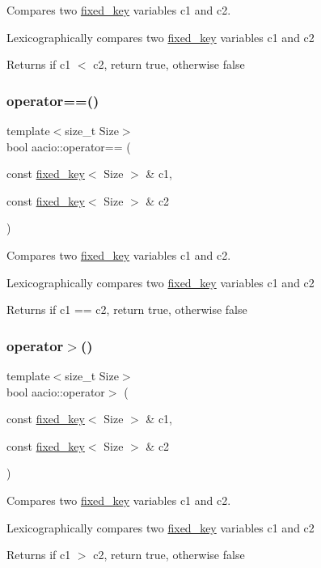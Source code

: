 Compares two \mbox{\hyperlink{classaacio_1_1fixed__key}{fixed\+\_\+key}} variables c1 and c2. 

Lexicographically compares two \mbox{\hyperlink{classaacio_1_1fixed__key}{fixed\+\_\+key}} variables c1 and c2 \begin{DoxyReturn}{Returns}
if c1 $<$ c2, return true, otherwise false 
\end{DoxyReturn}
\mbox{\label{group__fixed__key_gaa365a67b127212444054c9efbaad8b4b}} 
\subsubsection{\texorpdfstring{operator==()}{operator==()}}
{\footnotesize\ttfamily template$<$size\+\_\+t Size$>$ \\
bool aacio\+::operator== (\begin{DoxyParamCaption}\item[{const \mbox{\hyperlink{classaacio_1_1fixed__key}{fixed\+\_\+key}}$<$ Size $>$ \&}]{c1,  }\item[{const \mbox{\hyperlink{classaacio_1_1fixed__key}{fixed\+\_\+key}}$<$ Size $>$ \&}]{c2 }\end{DoxyParamCaption})}



Compares two \mbox{\hyperlink{classaacio_1_1fixed__key}{fixed\+\_\+key}} variables c1 and c2. 

Lexicographically compares two \mbox{\hyperlink{classaacio_1_1fixed__key}{fixed\+\_\+key}} variables c1 and c2 \begin{DoxyReturn}{Returns}
if c1 == c2, return true, otherwise false 
\end{DoxyReturn}
\mbox{\label{group__fixed__key_ga56d88aaf07a50b73e0494386c9f74fe9}} 
\subsubsection{\texorpdfstring{operator$>$()}{operator>()}}
{\footnotesize\ttfamily template$<$size\+\_\+t Size$>$ \\
bool aacio\+::operator$>$ (\begin{DoxyParamCaption}\item[{const \mbox{\hyperlink{classaacio_1_1fixed__key}{fixed\+\_\+key}}$<$ Size $>$ \&}]{c1,  }\item[{const \mbox{\hyperlink{classaacio_1_1fixed__key}{fixed\+\_\+key}}$<$ Size $>$ \&}]{c2 }\end{DoxyParamCaption})}



Compares two \mbox{\hyperlink{classaacio_1_1fixed__key}{fixed\+\_\+key}} variables c1 and c2. 

Lexicographically compares two \mbox{\hyperlink{classaacio_1_1fixed__key}{fixed\+\_\+key}} variables c1 and c2 \begin{DoxyReturn}{Returns}
if c1 $>$ c2, return true, otherwise false 
\end{DoxyReturn}
